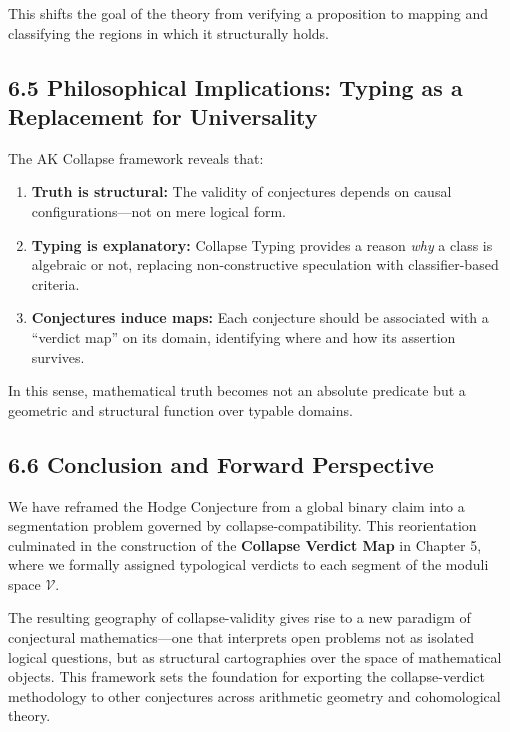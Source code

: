 \documentclass[11pt]{article}
\begin{document}
This shifts the goal of the theory from verifying a proposition to mapping and classifying the regions in which it structurally holds.

\subsection{6.5 Philosophical Implications: Typing as a Replacement for Universality}

The AK Collapse framework reveals that:

\begin{enumerate}
  \item \textbf{Truth is structural:}  
    The validity of conjectures depends on causal configurations—not on mere logical form.

  \item \textbf{Typing is explanatory:}  
    Collapse Typing provides a reason \emph{why} a class is algebraic or not, replacing non-constructive speculation with classifier-based criteria.

  \item \textbf{Conjectures induce maps:}  
    Each conjecture should be associated with a “verdict map” on its domain, identifying where and how its assertion survives.
\end{enumerate}

In this sense, mathematical truth becomes not an absolute predicate but a geometric and structural function over typable domains.

\subsection{6.6 Conclusion and Forward Perspective}

We have reframed the Hodge Conjecture from a global binary claim into a segmentation problem governed by collapse-compatibility. This reorientation culminated in the construction of the \textbf{Collapse Verdict Map} in Chapter 5, where we formally assigned typological verdicts to each segment of the moduli space $\mathcal{V}$.

The resulting geography of collapse-validity gives rise to a new paradigm of conjectural mathematics—one that interprets open problems not as isolated logical questions, but as structural cartographies over the space of mathematical objects. This framework sets the foundation for exporting the collapse-verdict methodology to other conjectures across arithmetic geometry and cohomological theory.
\end{document}
